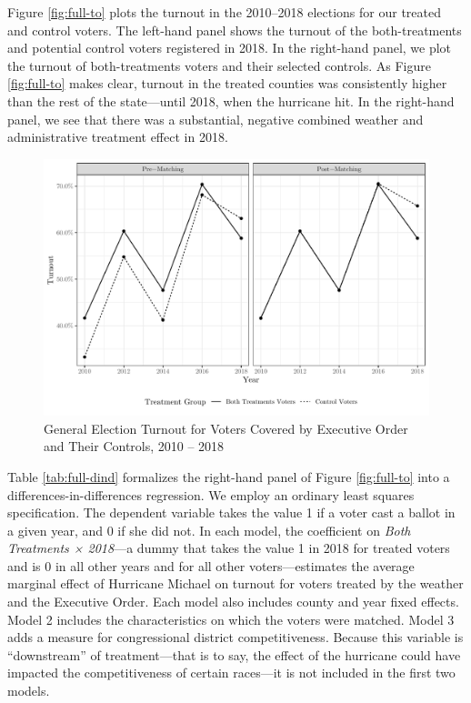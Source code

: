 \documentclass[
  12pt,
]{article}
\begin{document}
Figure \ref{fig:full-to} plots the turnout in the 2010--2018 elections for our treated and control voters. The left-hand panel shows the turnout of the both-treatments and potential control voters registered in 2018. In the right-hand panel, we plot the turnout of both-treatments voters and their selected controls. As Figure \ref{fig:full-to} makes clear, turnout in the treated counties was consistently higher than the rest of the state---until 2018, when the hurricane hit. In the right-hand panel, we see that there was a substantial, negative combined weather and administrative treatment effect in 2018.

\begin{figure}[h]

{\centering \includegraphics{hurricane_michael_files/figure-latex/full-to-chunk-1} 

}

\caption{\label{fig:full-to}General Election Turnout for Voters Covered by Executive Order and Their Controls, 2010 -- 2018}\label{fig:full-to-chunk}
\end{figure}

Table \ref{tab:full-dind} formalizes the right-hand panel of Figure \ref{fig:full-to} into a differences-in-differences regression. We employ an ordinary least squares specification. The dependent variable takes the value 1 if a voter cast a ballot in a given year, and 0 if she did not. In each model, the coefficient on \emph{Both Treatments × 2018}---a dummy that takes the value 1 in 2018 for treated voters and is 0 in all other years and for all other voters---estimates the average marginal effect of Hurricane Michael on turnout for voters treated by the weather and the Executive Order. Each model also includes county and year fixed effects. Model 2 includes the characteristics on which the voters were matched. Model 3 adds a measure for congressional district competitiveness. Because this variable is ``downstream'' of treatment---that is to say, the effect of the hurricane could have impacted the competitiveness of certain races---it is not included in the first two models.
\end{document}
